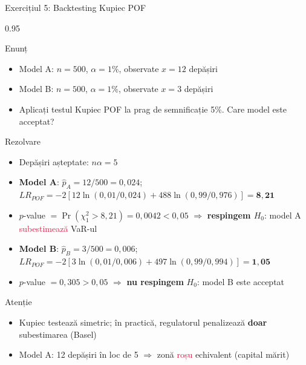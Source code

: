 \documentclass[9pt, aspectratio=169, t]{beamer}
\begin{document}
\begin{frame}[shrink=10]{Exercițiul 5: Backtesting Kupiec POF}
    \begin{cminipage}{0.95\textwidth}
    \begin{block}{Enunț}
    \begin{itemize}\setlength{\itemsep}{0pt}
        \item Model A: $n = 500$, $\alpha = 1\%$, observate $x = 12$ depășiri
        \item Model B: $n = 500$, $\alpha = 1\%$, observate $x = 3$ depășiri
        \item Aplicați testul Kupiec POF la prag de semnificație 5\%. Care model este acceptat?
    \end{itemize}
    \end{block}
    \vspace{0.1cm}
    \begin{exampleblock}{Rezolvare}
    \begin{itemize}\setlength{\itemsep}{0pt}
        \item Depășiri așteptate: $n\alpha = 5$
        \item \textbf{Model A}: $\hat{p}_A = 12/500 = 0{,}024$; $LR_{POF} = -2[12\ln(0{,}01/0{,}024) + 488\ln(0{,}99/0{,}976)] = \mathbf{8{,}21}$
        \item $p$-value $= \Pr(\chi^2_1 > 8{,}21) = 0{,}0042 < 0{,}05$ $\Rightarrow$ \textbf{respingem $H_0$}: model A \textcolor{Crimson}{subestimează} VaR-ul
        \item \textbf{Model B}: $\hat{p}_B = 3/500 = 0{,}006$; $LR_{POF} = -2[3\ln(0{,}01/0{,}006) + 497\ln(0{,}99/0{,}994)] = \mathbf{1{,}05}$
        \item $p$-value $= 0{,}305 > 0{,}05$ $\Rightarrow$ \textbf{nu respingem} $H_0$: model B este acceptat
    \end{itemize}
    \end{exampleblock}
    \begin{alertblock}{Atenție}
    \begin{itemize}\setlength{\itemsep}{0pt}
        \item Kupiec testează simetric; în practică, regulatorul penalizează \textbf{doar} subestimarea (Basel)
        \item Model A: 12 depășiri în loc de 5 $\Rightarrow$ zonă \textcolor{Crimson}{roșu} echivalent (capital mărit)
    \end{itemize}
    \end{alertblock}
    \end{cminipage}
\end{frame}
\end{document}
